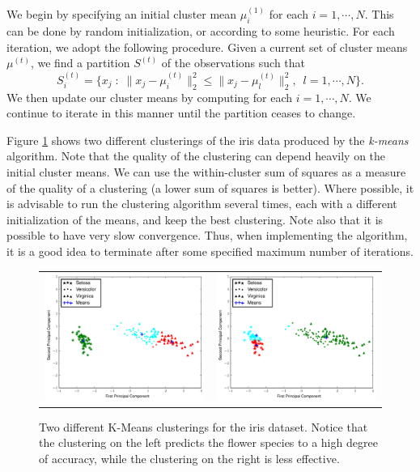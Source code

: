 We begin by specifying an initial cluster mean $\mu_i^{(1)}$ for each $i = 1, \cdots, N$. 
This can be done by random initialization, or according to some heuristic.
For each iteration, we adopt the following procedure.
Given a current set of cluster means $\mu^{(t)}$, we find a partition $S^{(t)}$ of the observations such that
\begin{equation*}
S_{i}^{(t)} = \{x_j \; : \; \|x_j - \mu_{i}^{(t)}\|_2^2 \leq \|x_j - \mu_{l}^{(t)}\|_2^2,\,\,\,  l = 1, \cdots, N\}.
\end{equation*}
We then update our cluster means by computing for each $i = 1, \cdots, N$.
We continue to iterate in this manner until the partition ceases to change.


Figure \ref{fig:iris_clusterings} shows two different clusterings of the iris data produced by the \emph{k-means} algorithm.
Note that the quality of the clustering can depend heavily on the initial cluster means.
We can use the within-cluster sum of squares as a measure of the quality of a clustering (a lower sum of squares is better).
Where possible, it is advisable to run the clustering algorithm several times, each with a different initialization of the means,
and keep the best clustering.
Note also that it is possible to have very slow convergence.
Thus, when implementing the algorithm, it is a good idea to terminate after some specified maximum number of iterations.
%
\begin{figure}[h]
    \centering
    \begin{tabular}{cc}
    \includegraphics[width=.49\textwidth]{figures/iris_means_1.pdf} &
    \includegraphics[width=.49\textwidth]{figures/iris_means_2.pdf}
    \end{tabular}
    \caption{Two different K-Means clusterings for the iris dataset.
            Notice that the clustering on the left predicts the flower species to a high degree of accuracy,
            while the clustering on the right is less effective.}
    \label{fig:iris_clusterings}
\end{figure}

